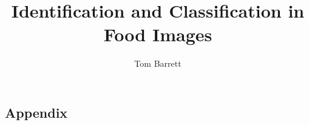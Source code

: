\documentclass[a4paper,12pt,fleqn]{report}
\newcommand\blankpage{%
        \null
        \thispagestyle{empty}%
        \addtocounter{page}{-1}%
        \newpage}
\begin{document}
\title{Identification and Classification in Food Images}
\author{Tom Barrett}
\maketitle




%
%
\tableofcontents
\listoffigures
\listoftables







\printbibliography

\begin{appendices}
\chapter{Appendix}

\end{appendices}
\end{document}
